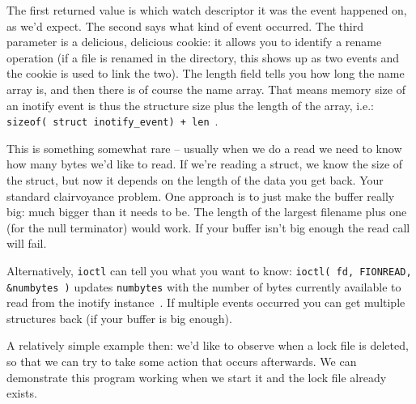 The first returned value is which watch descriptor it was the event happened on, as we'd expect. The second says what kind of event occurred. The third parameter is a delicious, delicious cookie: it allows you to identify a rename operation (if a file is renamed in the directory, this shows up as two events and the cookie is used to link the two). The length field tells you how long the name array is, and then there is of course the name array. That means memory size of an inotify event is thus the structure size plus the length of the array, i.e.: \texttt{sizeof( struct inotify\_event) + len}~\cite{lpi}.

This is something somewhat rare -- usually when we do a read we need to know how many bytes we'd like to read. If we're reading a struct, we know the size of the struct, but now it depends on the length of the data you get back. Your standard clairvoyance problem. One approach is to just make the buffer really big: much bigger than it needs to be. The length of the largest filename plus one (for the null terminator) would work. If your buffer isn't big enough the read call will fail.

Alternatively, \texttt{ioctl} can tell you what you want to know: \texttt{ioctl( fd, FIONREAD, \&numbytes )} updates \texttt{numbytes} with the number of bytes currently available to read from the inotify instance~\cite{lpi}.  If multiple events occurred you can get multiple structures back (if your buffer is big enough).

A relatively simple example then: we'd like to observe when a lock file is deleted, so that we can try to take some action that occurs afterwards. We can demonstrate this program working when we start it and the lock file already exists.

